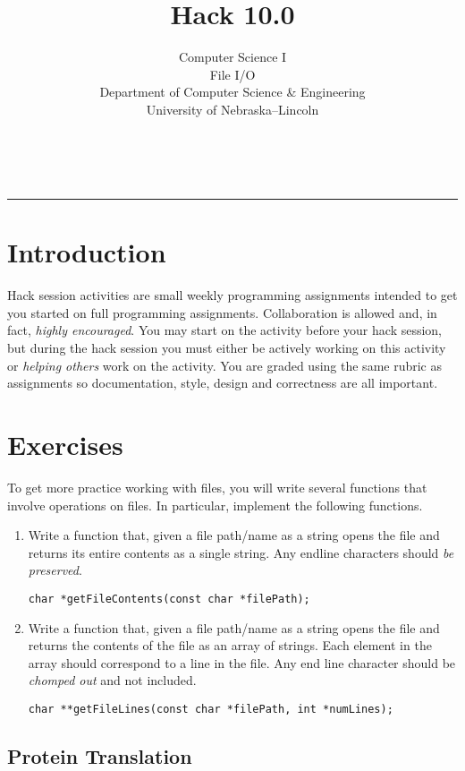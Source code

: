 \documentclass[12pt]{scrartcl}
\title{Hack 10.0}\let\Title\@title
\subtitle{Computer Science I\\
File I/O\\
{\small
\vskip1cm
Department of Computer Science \& Engineering \\
University of Nebraska--Lincoln}
\vskip-2cm}
\date{~}
\begin{document}
\maketitle

\hrule

\section*{Introduction}

Hack session activities are small weekly programming assignments intended
to get you started on full programming assignments.  Collaboration is allowed
and, in fact, \emph{highly encouraged}.  You may start on the activity before
your hack session, but during the hack session you must either be actively 
working on this activity or \emph{helping others} work on the activity.
You are graded using the same rubric as assignments so documentation, style, 
design and correctness are all important.  

\section*{Exercises}

To get more practice working with files, you will write several 
functions that involve operations on files.  In particular, implement
the following functions.

\begin{enumerate}

  \item Write a function that, given a file path/name as a string opens
  the file and returns its entire contents as a single string.  Any endline
  characters should \emph{be preserved}.
  
  \texttt{char *getFileContents(const char *filePath);}

  \item Write a function that, given a file path/name as a string opens
  the file and returns the contents of the file as an array of strings.
  Each element in the array should correspond to a line in the file.
  Any end line character should be \emph{chomped out} and not included.

  \texttt{char **getFileLines(const char *filePath, int *numLines);}

\end{enumerate}

\subsection*{Protein Translation}
\end{document}
